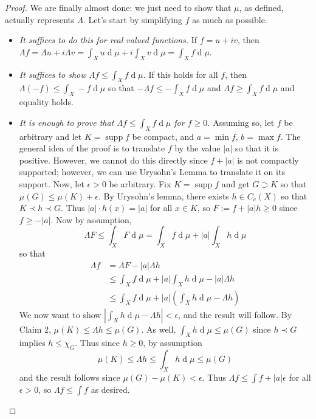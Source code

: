 \documentclass[12pt, a4paper]{book}
\DeclareMathOperator{\supp}{supp}
\renewcommand{\d}[1]{\ensuremath{\operatorname{d}\!{#1}}} %
\theoremstyle{nonumberplain}
\newtheorem{proof}{Proof}
\begin{document}
\begin{proof}
    We are finally almost done: we just need to show that $\mu$, as defined, actually represents $\Lambda$.
    Let's start by simplifying $f$ as much as possible.
    \begin{itemize}[nolistsep]
        \item \textit{It suffices to do this for real valued functions.}
            If $f=u+iv$, then $\Lambda f=\Lambda u+i\Lambda v=\int_X u\d{\mu}+i\int_X v\d{\mu}=\int_X f\d{\mu}$.
        \item \textit{It suffices to show $\Lambda f\leq\int_X f\d{\mu}$.}
            If this holds for all $f$, then $\Lambda(-f)\leq\int_X -f\d{\mu}$ so that $-\Lambda f\leq -\int_X f\d{\mu}$ and $\Lambda f\geq\int_X f\d{\mu}$ and equality holds.
        \item \textit{It is enough to prove that $\Lambda f\leq\int_X f\d{\mu}$ for $f\geq 0$.}
            Assuming so, let $f$ be arbitrary and let $K=\supp f$ be compact, and $a=\min f$, $b=\max f$.
            The general idea of the proof is to translate $f$ by the value $|a|$ so that it is positive.
            However, we cannot do this directly since $f+|a|$ is not compactly supported; however, we can use Urysohn's Lemma to translate it on its support.
            Now, let $\epsilon>0$ be arbitrary.
            Fix $K=\supp f$ and get $G\supset K$ so that $\mu(G)\leq\mu(K)+\epsilon$.
            By Urysohn's lemma, there exists $h\in C_c(X)$ so that $K\prec h\prec G$.
            Thus $|a|\cdot h(x)=|a|$ for all $x\in K$, so $F:=f+|a|h\geq 0$ since $f\geq -|a|$.
            Now by assumption,
            \[\Lambda F\leq\int_X F\d{\mu}=\int_X f\d{\mu}+|a|\int_X h\d{\mu}\]
            so that
            \begin{align*}
                \Lambda f &= \Lambda F-|a|\Lambda h\\
                          &\leq\int_X f\d{\mu}+|a|\int_X h\d{\mu}-|a|\Lambda h\\
                          &\leq \int_X f\d{\mu}+|a|\left(\int_X h\d{\mu}-\Lambda h\right)
            \end{align*}
            We now want to show $|\int_X h\d{\mu}-\Lambda h|<\epsilon$, and the result will follow.
            By Claim 2, $\mu(K)\leq\Lambda h\leq\mu(G)$.
            As well, $\int_X h\d{\mu}\leq \mu(G)$ since $h\prec G$ implies $h\leq\chi_G$.
            Thus since $h\geq 0$, by assumption
            \[\mu(K)\leq \Lambda h\leq\int_X h\d{\mu}\leq\mu(G)\]
            and the result follows since $\mu(G)-\mu(K)<\epsilon$.
            Thus $\Lambda f\leq\int f+|a|\epsilon$ for all $\epsilon>0$, so $\Lambda f\leq\int f$ as desired.
    \end{itemize}


\end{proof}
\end{document}
